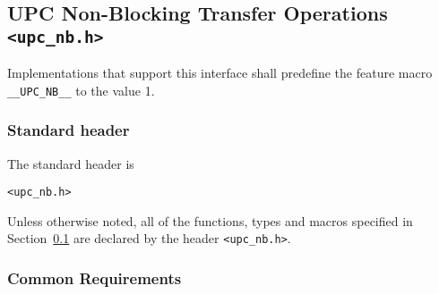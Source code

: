 \def \memcpy  {{\tt upc\_memcpy}\xspace}
\def \memget  {{\tt upc\_memget}\xspace}
\def \memput  {{\tt upc\_memput}\xspace}
\def \memset  {{\tt upc\_memset}\xspace}

\def \memall  {{\tt upc\_mem\{put, get, cpy\}}\xspace}
\def \memstar {{\tt upc\_mem*}\xspace}
\def \TIF {transfer initiation function\xspace}
\def \TIFs {\TIF{}s}

\def \bnbheader {<upc\_nb.h>\xspace}
\def \nbheader  {{\tt \bnbheader}\xspace}
\def \incheader {{\tt \#include \bnbheader}}

\def \sync  {{\tt upc\_sync[\_attempt]}\xspace}
\def \synci {{\tt upc\_synci[\_attempt]}\xspace}

\def \complete {{\tt UPC\_COMPLETE\_HANDLE}\xspace}

\def\func{{\tt \bfunc}\xspace}
\def\args{{\tt (dst, src, n)}\xspace}
\def\sargs{{\tt (dst, c, n)}\xspace}

\def\funcheader{%
  \paragraph{The \func function}%
  \expandafter\index\expandafter{\bfunc}%

{\bf Synopsis}

\npf \incheader%
\vspace{-8pt}%
}

\subsection{UPC Non-Blocking Transfer Operations \nbheader}
\label{upc-nb}

\npf Implementations that support this interface shall predefine the
feature macro {\tt \_\_UPC\_NB\_\_} to the value 1.

\subsubsection{Standard header}

\np The standard header is

\nbheader

\np Unless otherwise noted, all of the functions, types and macros
    specified in Section~\ref{upc-nb}
    are declared by the header \nbheader.

\subsubsection{Common Requirements}
\label{upc-nb-common}

